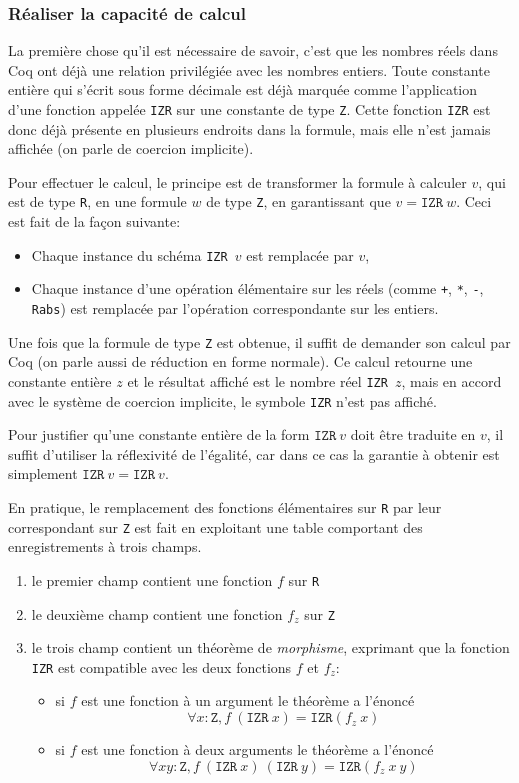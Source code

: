 \documentclass[draft]{jflart}
\begin{document}
\subsubsection{Réaliser la capacité de calcul}
La première chose qu'il est nécessaire de savoir, c'est que les
nombres réels dans Coq ont déjà une relation privilégiée avec les
nombres entiers.  Toute constante entière qui s'écrit sous forme
décimale est déjà marquée comme l'application d'une fonction appelée
\texttt{IZR} sur une constante de type \texttt{Z}.  Cette fonction \texttt{IZR}
est donc déjà présente en plusieurs endroits dans la formule, mais
elle n'est jamais affichée (on parle de coercion implicite).

Pour effectuer le calcul, le principe est de transformer la formule à
calculer \(v\), qui est de type \texttt{R}, en une formule \(w\)
de type \texttt{Z}, en garantissant que \(v = \texttt{IZR}~w\).  Ceci est
fait de la façon suivante:
\begin{itemize}
\item Chaque instance du schéma \texttt{IZR \(v\)} est remplacée par \(v\),
\item Chaque instance d'une opération élémentaire sur les
réels (comme \texttt{+}, \texttt{*}, \texttt{-}, \texttt{Rabs}) est remplacée par
l'opération correspondante sur les entiers.
\end{itemize}
Une fois que la formule de type \texttt{Z} est obtenue, il suffit de demander
son calcul par Coq (on parle aussi de réduction en forme normale).
Ce calcul retourne une constante entière \(z\) et le résultat
affiché est le nombre réel \texttt{IZR \(z\)}, mais en accord avec le
système de coercion implicite, le symbole \texttt{IZR} n'est pas affiché.

Pour justifier qu'une constante entière de la form \(\texttt{IZR}~v\)
doit être traduite en \(v\), il suffit d'utiliser la réflexivité de
l'égalité, car dans ce cas la garantie à obtenir est simplement
\(\texttt{IZR}~v = \texttt{IZR}~v\).

En pratique, le remplacement des fonctions élémentaires sur \texttt{R} par
leur correspondant sur \texttt{Z} est fait en exploitant une table
comportant des enregistrements à trois champs.
\begin{enumerate}
\item le premier champ contient une fonction \(f\) sur \texttt{R}
\item le deuxième champ contient une fonction \(f_z\) sur \texttt{Z}
\item le trois champ contient un théorème de {\em morphisme},
  exprimant que la fonction \texttt{IZR} est compatible avec les deux
  fonctions \(f\) et \(f_z\):
\begin{itemize}
\item si \(f\) est une fonction à un argument le théorème a l'énoncé
\[\forall x : \texttt{Z}, f~(\texttt{IZR}~x)=\texttt{IZR}(f_z~x)\]
\item si \(f\) est une fonction à deux arguments le théorème a l'énoncé
\[\forall x y : \texttt{Z}, f~(\texttt{IZR}~x)~(\texttt{IZR}~y)=\texttt{IZR}(f_z~x~y)\]
\end{itemize}
\end{enumerate}
\end{document}
